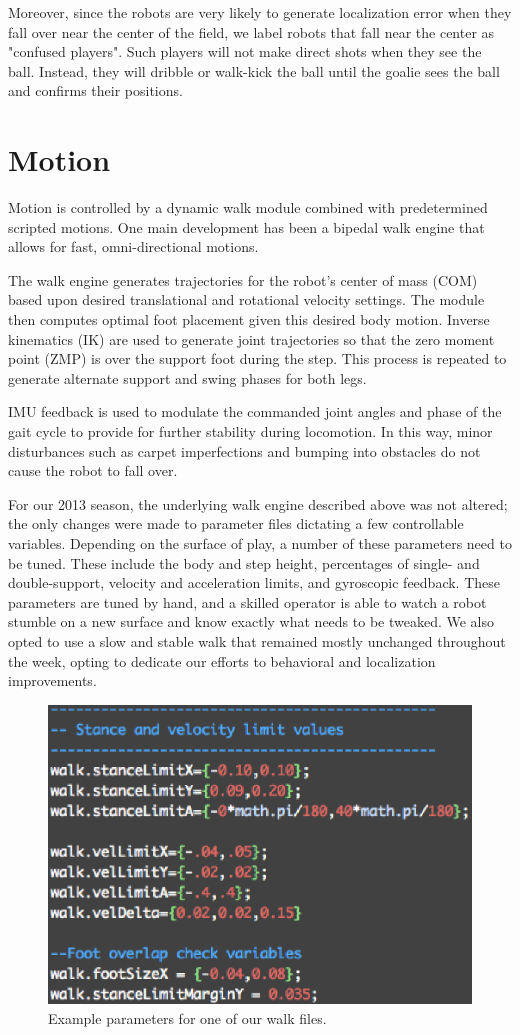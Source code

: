 \documentclass{article}
\begin{document}
	  Moreover, since the robots are very likely to generate localization error when they fall over near the center of the field, we label robots that fall near the center as "confused players". Such players will not make direct shots when they see the ball. Instead, they will dribble or walk-kick the ball until the goalie sees the ball and confirms their positions.



\section{Motion}
	Motion is controlled by a dynamic walk module combined with predetermined scripted motions. One main development has been a bipedal walk engine that allows for fast, omni-directional motions.

	The walk engine generates trajectories for the robot's center of mass (COM) based upon desired translational and rotational velocity settings. The module then computes optimal foot placement given this desired body motion. Inverse kinematics (IK) are used to generate joint trajectories so that the zero moment point (ZMP) is over the support foot during the step. This process is repeated to generate alternate support and swing phases for both legs.

	IMU feedback is used to modulate the commanded joint angles and phase of the gait cycle to provide for further stability during locomotion. In this way, minor disturbances such as carpet imperfections and bumping into obstacles do not cause the robot to fall over.

	For our 2013 season, the underlying walk engine described above was not altered; the only changes were made to parameter files dictating a few controllable variables. Depending on the surface of play, a number of these parameters need to be tuned. These include the body and step height, percentages of single- and double-support, velocity and acceleration limits, and gyroscopic feedback. These parameters are tuned by hand, and a skilled operator is able to watch a robot stumble on a new surface and know exactly what needs to be tweaked. We also opted to use a slow and stable walk that remained mostly unchanged throughout the week, opting to dedicate our efforts to behavioral and localization improvements.

	\begin{figure}[H]
		\centering
		\includegraphics[width=.60\textwidth]{figures/WalkFile.eps}
		\caption{Example parameters for one of our walk files.}
	\end{figure}
\end{document}

